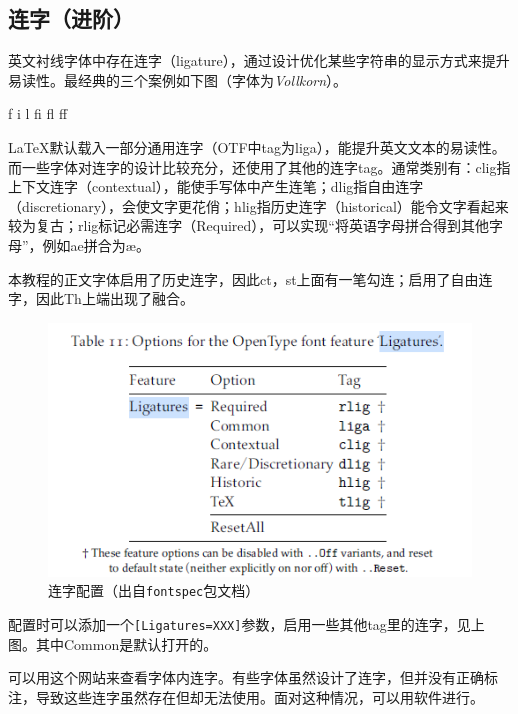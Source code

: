 \documentclass[10pt,openany]{book}
\begin{document}
\begin{sloppypar}


\subsection{连字（进阶）}

英文衬线字体中存在连字（ligature），通过设计优化某些字符串的显示方式来提升易读性。最经典的三个案例如下图（字体为\textit{Vollkorn}）。

\begin{minipage}[c][3\baselineskip]{30\ccwd}
    \centering{}\Huge f i l fi fl ff
\end{minipage}

{\LaTeX}默认载入一部分通用连字（OTF中tag为liga），能提升英文文本的易读性。而一些字体对连字的设计比较充分，还使用了其他的连字tag。通常类别有：clig指上下文连字（contextual），能使手写体中产生连笔；dlig指自由连字（discretionary），会使文字更花俏；hlig指历史连字（historical）能令文字看起来较为复古；rlig标记必需连字（Required），可以实现“将英语字母拼合得到其他字母”，例如ae拼合为æ。

本教程的正文字体启用了历史连字，因此ct，st上面有一笔勾连；启用了自由连字，因此Th上端出现了融合。

\begin{figure}[H]
    \centering
    \includegraphics[width=.7\linewidth]{data/ligatures.png}
    \caption{连字配置（出自\texttt{fontspec}包文档）}
\end{figure}

配置时可以添加一个\texttt{{[}Ligatures=XXX{]}}参数，启用一些其他tag里的连字，见上图。其中Common是默认打开的。

可以用这个网站来查看字体内连字。有些字体虽然设计了连字，但并没有正确标注，导致这些连字虽然存在但却无法使用。面对这种情况，可以用软件进行。


\end{sloppypar}
\end{document}
